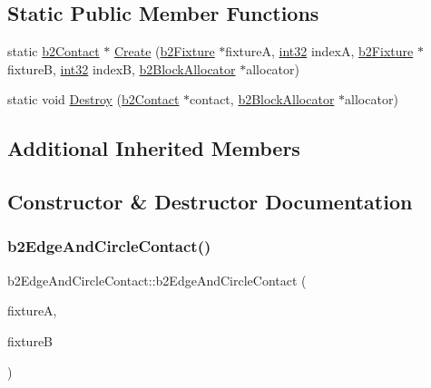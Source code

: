 \subsection*{Static Public Member Functions}
\begin{DoxyCompactItemize}
\item 
static \mbox{\hyperlink{classb2_contact}{b2\+Contact}} $\ast$ \mbox{\hyperlink{classb2_edge_and_circle_contact_a1b4a2a1d4098288c84a7778a4949d0f0}{Create}} (\mbox{\hyperlink{classb2_fixture}{b2\+Fixture}} $\ast$fixtureA, \mbox{\hyperlink{b2_settings_8h_a43d43196463bde49cb067f5c20ab8481}{int32}} indexA, \mbox{\hyperlink{classb2_fixture}{b2\+Fixture}} $\ast$fixtureB, \mbox{\hyperlink{b2_settings_8h_a43d43196463bde49cb067f5c20ab8481}{int32}} indexB, \mbox{\hyperlink{classb2_block_allocator}{b2\+Block\+Allocator}} $\ast$allocator)
\item 
static void \mbox{\hyperlink{classb2_edge_and_circle_contact_a123eeb8144b01fc15c1318eacd0da4ca}{Destroy}} (\mbox{\hyperlink{classb2_contact}{b2\+Contact}} $\ast$contact, \mbox{\hyperlink{classb2_block_allocator}{b2\+Block\+Allocator}} $\ast$allocator)
\end{DoxyCompactItemize}
\subsection*{Additional Inherited Members}


\subsection{Constructor \& Destructor Documentation}
\mbox{\label{classb2_edge_and_circle_contact_a9de91d6afe4d2407f679b2ccaded9c02}} 
\subsubsection{\texorpdfstring{b2EdgeAndCircleContact()}{b2EdgeAndCircleContact()}}
{\footnotesize\ttfamily b2\+Edge\+And\+Circle\+Contact\+::b2\+Edge\+And\+Circle\+Contact (\begin{DoxyParamCaption}\item[{\mbox{\hyperlink{classb2_fixture}{b2\+Fixture}} $\ast$}]{fixtureA,  }\item[{\mbox{\hyperlink{classb2_fixture}{b2\+Fixture}} $\ast$}]{fixtureB }\end{DoxyParamCaption})}

